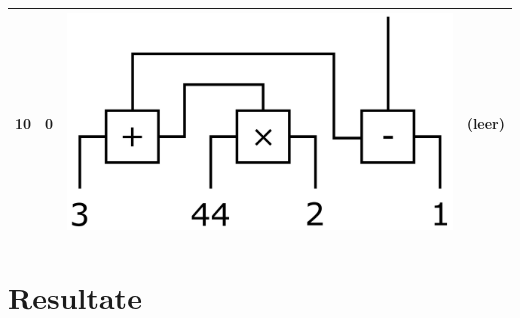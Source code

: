 \documentclass[12pt, a4paper]{report}
\begin{document}
\begin{center}
\begin{tabular}{ |l|l|c|c| }
	10 & 0 & \includegraphics[trim=0 -2 0 -3,height=0.11\textheight]{assets/expr3.jpg} & (leer) \\ 
	\hline
\end{tabular}
\end{center}
\chapter{Resultate}
\end{document}
